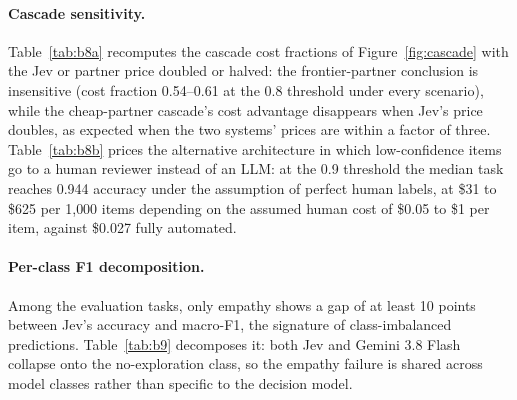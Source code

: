 \documentclass[11pt]{article}
\begin{document}
\paragraph{Cascade sensitivity.}
Table~\ref{tab:b8a} recomputes the cascade cost fractions of Figure~\ref{fig:cascade} with the Jev or partner price doubled or halved: the frontier-partner conclusion is insensitive (cost fraction 0.54--0.61 at the 0.8 threshold under every scenario), while the cheap-partner cascade's cost advantage disappears when Jev's price doubles, as expected when the two systems' prices are within a factor of three. Table~\ref{tab:b8b} prices the alternative architecture in which low-confidence items go to a human reviewer instead of an LLM: at the 0.9 threshold the median task reaches 0.944 accuracy under the assumption of perfect human labels, at \$31 to \$625 per 1{,}000 items depending on the assumed human cost of \$0.05 to \$1 per item, against \$0.027 fully automated.

\begin{table}[!htbp]
\centering
\caption{Median cascade cost as a fraction of the partner-alone cost under $\pm 2\times$ price assumptions.}
\label{tab:b8a}
\small

\end{table}

\begin{table}[!htbp]
\centering
\caption{Jev-plus-human-review pricing; items below the confidence threshold are routed to a human assumed correct, at the stated cost per item.}
\label{tab:b8b}
\small

\end{table}

\paragraph{Per-class F1 decomposition.}
Among the evaluation tasks, only empathy shows a gap of at least 10 points between Jev's accuracy and macro-F1, the signature of class-imbalanced predictions. Table~\ref{tab:b9} decomposes it: both Jev and Gemini 3.8 Flash collapse onto the no-exploration class, so the empathy failure is shared across model classes rather than specific to the decision model.

\begin{table}[!htbp]
\centering
\caption{Per-class precision, recall, and F1 on the empathy task, the one evaluation task with an accuracy-to-macro-F1 gap of at least 10 points.}
\label{tab:b9}
\small

\end{table}
\end{document}
